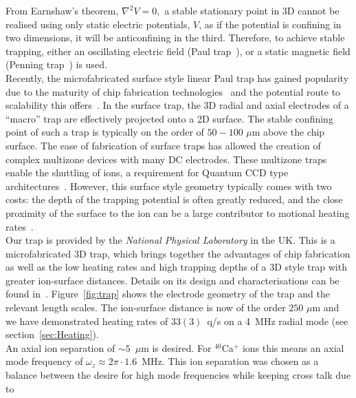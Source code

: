     From Earnshaw's theorem,
    $\nabla^2 V = 0,$ a stable stationary point in 3D cannot be realised
    using only static electric potentials, $V$, as if the potential is confining
    in two dimensions, it will be anticonfining in the third. Therefore, to
    achieve stable trapping, either an oscillating electric field (Paul
    trap~\cite{paul_electromagnetic_1990}), or a static magnetic field (Penning trap~\cite{}) is
    used.\\
    Recently, the microfabricated surface style linear Paul trap has gained
    popularity due to the maturity of chip fabrication
    technologies~\cite{allcock_surface-electrode_2011} and the potential route
    to scalability this offers~\cite{kielpinski_architecture_2002}. In the surface trap, the 3D radial and axial
    electrodes of a ``macro'' trap are effectively projected onto a 2D surface.
    The stable confining point of such a trap is typically on the order of $50-100$ $\mu$m
    above the chip surface. The ease of fabrication of surface traps has allowed
    the creation of complex multizone devices with many DC electrodes.  These
    multizone traps enable the shuttling of ions, a requirement for Quantum CCD
    type architectures~\cite{kielpinski_architecture_2002}. However, this
    surface style geometry typically comes with two costs: the depth of the
    trapping potential is often greatly reduced, and the close proximity of the
    surface to the ion can be a large contributor to motional heating
    rates~\cite{turchette_heating_2000}. \\
    Our trap is provided by the \emph{National Physical Laboratory} in the UK. This is a microfabricated 3D trap, which brings together the
    advantages of chip fabrication as well as the low heating rates and high
    trapping depths of a 3D style trap with greater ion-surface distances. Details on its design and characterisations can be found in~\cite{see_fabrication_2013,
    wilpers_monolithic_2012}. Figure~\ref{fig:trap} shows the electrode geometry of the trap and the relevant length scales.
    The ion-surface distance is now of the order $250$ $\mu$m and we have
    demonstrated heating rates of $ 33(3)$~q/s on a 4~MHz radial mode (see
    section~\ref{sec:Heating}).\\
    An axial ion separation of $\sim 5$~$\mu$m is desired. For
    $^{40}$Ca$^{+}$ ions this means an axial mode frequency of $\omega_z \approx 2\pi
    \cdot 1.6$~MHz. This ion separation was chosen as a balance between the
    desire for high mode frequencies while keeping cross talk due to

